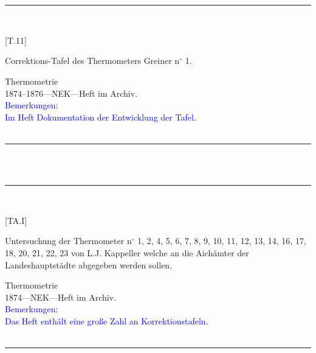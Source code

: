 \\
\vspace*{-2.5pt}\\
\parbox{\textwidth}{%
\rule{\textwidth}{1pt}\vspace*{-3mm}\\
\begin{minipage}[t]{0.22\textwidth}\vspace{0pt}
\Huge\rule[-4mm]{0cm}{1cm}[T.11]
\end{minipage}
\hfill
\begin{minipage}[t]{0.78\textwidth}\vspace{0pt}
\large Correktions-Tafel des Thermometers Greiner n{$^\circ$} 1.\rule[-2mm]{0mm}{2mm}
\end{minipage}
{\footnotesize\flushright
Thermometrie\\
}
1874--1876\quad---\quad NEK\quad---\quad Heft im Archiv.\\
\textcolor{blue}{Bemerkungen:\\{}
Im Heft Dokumentation der Entwicklung der Tafel.\\{}
}
\\[-15pt]
\rule{\textwidth}{1pt}
}
\\
\vspace*{-2.5pt}\\
\parbox{\textwidth}{%
\rule{\textwidth}{1pt}\vspace*{-3mm}\\
\begin{minipage}[t]{0.22\textwidth}\vspace{0pt}
\Huge\rule[-4mm]{0cm}{1cm}[TA.I]
\end{minipage}
\hfill
\begin{minipage}[t]{0.78\textwidth}\vspace{0pt}
\large Untersuchung der Thermometer n{$^\circ$} 1, 2, 4, 5, 6, 7, 8, 9, 10, 11, 12, 13, 14, 16, 17, 18, 20, 21, 22, 23 von L.J. Kappeller welche an die Aichämter der Landeshauptstädte abgegeben werden sollen.\rule[-2mm]{0mm}{2mm}
\end{minipage}
{\footnotesize\flushright
Thermometrie\\
}
1874\quad---\quad NEK\quad---\quad Heft im Archiv.\\
\textcolor{blue}{Bemerkungen:\\{}
Das Heft enthält eine große Zahl an Korrektionstafeln.\\{}
}
\\[-15pt]
\rule{\textwidth}{1pt}
}
